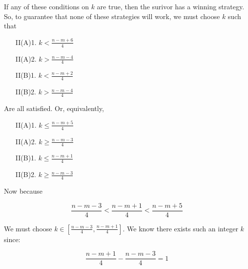 \documentclass[letterpaper, 10pt]{article}
\begin{document}
\begin{enumerate}
\begin{itemize}
       \end{itemize}

       If any of these conditions on $k$ are true, then the surivor has a winning strategy.
       So, to guarantee that none of these strategies will work, we must choose $k$ such that

       \begin{itemize}
        \item[II(A)1.] $k < \frac{n-m+6}{4}$
        \item[II(A)2.] $k > \frac{n-m-4}{4}$
        \item[II(B)1.] $k < \frac{n-m+2}{4}$
        \item[II(B)2.] $k > \frac{n-m-4}{4}$
       \end{itemize}

       Are all satisfied. Or, equivalently,

       \begin{itemize}
        \item[II(A)1.] $k \leq \frac{n-m+5}{4}$
        \item[II(A)2.] $k \geq \frac{n-m-3}{4}$
        \item[II(B)1.] $k \leq \frac{n-m+1}{4}$
        \item[II(B)2.] $k \geq \frac{n-m-3}{4}$
       \end{itemize}

       Now because

       \[ \frac{n-m-3}{4} < \frac{n-m+1}{4} < \frac{n-m+5}{4} \]

       We must choose $k \in [\frac{n-m-3}{4}, \frac{n-m+1}{4}]$. We know there exists
       such an integer $k$ since:

       \[ \frac{n-m+1}{4} - \frac{n-m-3}{4} = 1 \]



\end{enumerate}
\end{document}

